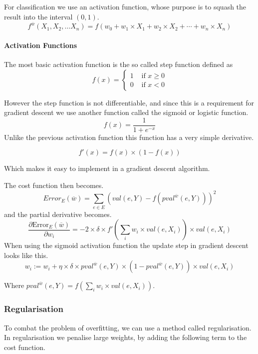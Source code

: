For classification we use an activation function, whose purpose is to squash the result into the interval $(0,1)$.
\[ f^{\overline{w}}(X_1, X_2, \dots X_n) = f(w_0 + w_1 \times X_1 + w_2 \times X_2 + \cdots + w_n \times X_n) \]

\paragraph{Activation Functions}

The most basic activation function is the so called step function defined as 
\[ f(x) = \begin{cases}

	1 &\text{ if } x \geq 0 \\
	0 &\text{ if } x < 0 
\end{cases}\]

However the step function is not differentiable, and since this is a requirement for gradient descent we use another
function called the sigmoid or logistic function.
\[ f(x) = \frac{1}{1+e^{-x}} \]
Unlike the previous activation function this function has a very simple derivative.

\[ f'(x) = f(x) \times (1-f(x)) \]

Which makes it easy to implement in a gradient descent algorithm.

The cost function then becomes.
\[ Error_E(\overline{w}) = \sum_{e \in E} \left(val(e,Y)-f\left(pval^{\overline{w}}(e,Y)\right)\right)^2 \]
and the partial derivative becomes.
\[ \frac{\partial \text{Error}_E(\overline{w})}{\partial w_i} 
	= -2 \times \delta \times f'\left(\sum_i w_i \times val(e,X_i)\right) \times val(e,X_i) \]
When using the sigmoid activation function the update step in gradient descent looks like this.
\[ w_i := w_i + \eta \times \delta \times pval^{\overline{w}}(e,Y) \times \left(1 - pval^{\overline{w}}(e,Y)\right) \times val(e,X_i) \]

Where $pval^{\overline{w}}(e,Y) = f(\sum_i w_i \times val(e,X_i))$.  


\begin{flushright}
\cite[p. 306-307]{AI2010}
\end{flushright}


\subsubsection{Regularisation}\label{sec:regular}
To combat the problem of overfitting, we can use a method called regularisation.
In regularisation we penalise large weights, by adding the following term to the cost function.

